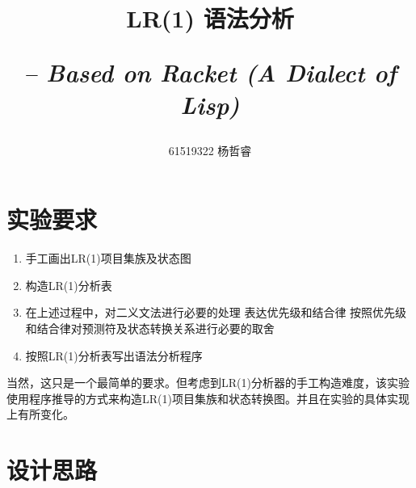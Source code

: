 \documentclass[lang=cn]{ctexart}
\title{
    LR(1) 语法分析
    \begin{flushright}\normalsize
        \textit{-- Based on Racket (A Dialect of Lisp)}
    \end{flushright}
}
\author{61519322 杨哲睿}
\begin{document}
\maketitle

\tableofcontents
\newpage

\section{实验要求}

\begin{enumerate}
    \item 手工画出LR(1)项目集族及状态图
    \item 构造LR(1)分析表
    \item 在上述过程中，对二义文法进行必要的处理
    \subitem 表达优先级和结合律
    \subitem 按照优先级和结合律对预测符及状态转换关系进行必要的取舍
    \item 按照LR(1)分析表写出语法分析程序
\end{enumerate}

当然，这只是一个最简单的要求。但考虑到LR(1)分析器的手工构造难度，该实验使用{\heiti 程序推导}的方式来构造LR(1)项目集族和状态转换图。并且在实验的具体实现上有所变化。

\section{设计思路}
\end{document}
